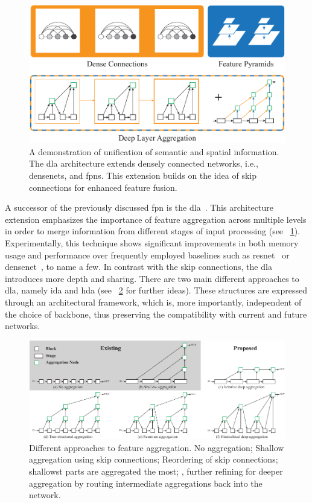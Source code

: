 \begin{figure}[t]
    \centerline{\includegraphics[width=0.7\linewidth]{figures/theoretical_foundations/dla_comparison.pdf}}
    \caption[\Gls{dla} comparison]{A demonstration of unification of semantic and spatial information. The \gls{dla} architecture extends densely connected networks, i.e., \glspl{densenet}, and \glspl{fpn}. This extension builds on the idea of skip connections for enhanced feature fusion. }
    \label{fig:DLAMotivation}
\end{figure}

A successor of the previously discussed \gls{fpn} is the \gls{dla}~\cite{yu2019dla}. This architecture extension emphasizes the importance of feature aggregation across multiple levels in order to merge information from different stages of input processing (see \figstr{}~\ref{fig:DLAMotivation}). Experimentally, this technique shows significant improvements in both memory usage and performance over frequently employed baselines such as \gls{resnet}~\cite{he2015resnet} or \gls{densenet}~\cite{huang2018densenet}, to name a few. In contrast with the skip connections, the \gls{dla} introduces more depth and sharing. There are two main different approaches to \gls{dla}, namely \gls{ida} and \gls{hda} (see \figstr{}~\ref{fig:DLADiffApproaches} for further ideas). These structures are expressed through an architectural framework, which is, more importantly, independent of the choice of backbone, thus preserving the compatibility with current and future networks.

\begin{figure}[t]
    \centerline{\includegraphics[width=0.8\linewidth]{figures/theoretical_foundations/dla_existing_vs_proposed.pdf}}
    \caption[\Gls{dla} proposed solution]{Different approaches to feature aggregation.  No aggregation;  Shallow aggregation using skip connections;  Reordering of skip connections;  shallowst parts are aggregated the most; ,  further refining for deeper aggregation by routing intermediate aggregations back into the network. }
    \label{fig:DLADiffApproaches}
\end{figure}

